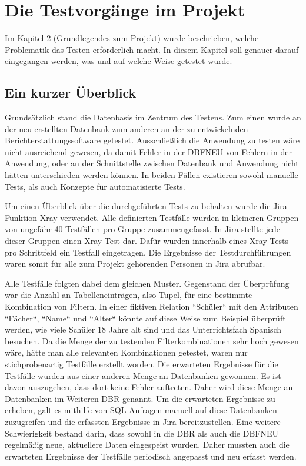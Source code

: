 \chapter{Die Testvorgänge im Projekt}
\nocite{*}
Im Kapitel 2 (Grundlegendes zum Projekt) wurde beschrieben, welche Problematik das Testen erforderlich macht. In diesem Kapitel soll genauer darauf eingegangen werden, was und auf welche Weise getestet wurde.
\section{Ein kurzer Überblick}
Grundsätzlich stand die Datenbasis im Zentrum des Testens. Zum einen wurde an der neu erstellten Datenbank zum anderen an der zu entwickelnden Berichterstattungssoftware getestet. Ausschließlich die Anwendung zu testen wäre nicht ausreichend gewesen, da damit Fehler in der \ac{DBFNEU} von Fehlern in der Anwendung, oder an der Schnittstelle zwischen Datenbank und Anwendung nicht hätten unterschieden werden können. In beiden Fällen existieren sowohl manuelle Tests, als auch Konzepte für automatisierte Tests. 
\newline


Um einen Überblick über die durchgeführten Tests zu behalten wurde die Jira Funktion Xray verwendet. Alle definierten Testfälle wurden in kleineren Gruppen von ungefähr 40 Testfällen pro Gruppe zusammengefasst. In Jira stellte jede dieser Gruppen einen Xray Test dar. Dafür wurden innerhalb eines Xray Tests pro Schrittfeld ein Testfall eingetragen. Die Ergebnisse der Testdurchführungen waren somit für alle zum Projekt gehörenden Personen in Jira abrufbar. 
\newline


Alle Testfälle folgten dabei dem gleichen Muster. Gegenstand der Überprüfung war die Anzahl an Tabelleneinträgen, also Tupel, für eine bestimmte Kombination von Filtern. In einer fiktiven Relation ``Schüler`` mit den Attributen ``Fächer``, ``Name`` und ``Alter`` könnte auf diese Weise zum Beispiel überprüft werden, wie viele Schüler 18 Jahre alt sind und das Unterrichtsfach Spanisch besuchen. Da die Menge der zu testenden Filterkombinationen sehr hoch gewesen wäre, hätte man alle relevanten Kombinationen getestet, waren nur stichprobenartig Testfälle erstellt worden. Die erwarteten Ergebnisse für die Testfälle wurden aus einer anderen Menge an Datenbanken gewonnen. Es ist davon auszugehen, dass dort keine Fehler auftreten. Daher wird diese Menge an Datenbanken im Weiteren \ac{DBR} genannt. Um die erwarteten Ergebnisse zu erheben, galt es mithilfe von \ac{SQL}-Anfragen manuell auf diese Datenbanken zuzugreifen und die erfassten Ergebnisse in Jira bereitzustellen. Eine weitere Schwierigkeit bestand darin, dass sowohl in die \ac{DBR} als auch die \ac{DBFNEU} regelmäßig neue, aktuellere Daten eingespeist wurden. Daher mussten auch die erwarteten Ergebnisse der Testfälle periodisch angepasst und neu erfasst werden.

